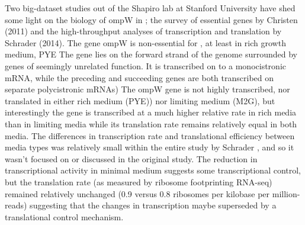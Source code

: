 Two big-dataset studies out of the Shapiro lab at Stanford University have shed some light on the biology of ompW in \caulobacter; the survey of essential genes by Christen \etal (2011) and the high-throughput analyses of transcription and translation by Schrader \etal (2014). The gene ompW is non-essential for \caulobacter, at least in rich growth medium, \ac{PYE} The gene lies on the forward strand of the genome surrounded by genes of seemingly unrelated function. It is transcribed on to a monocistronic mRNA, while the preceding and succeeding genes are both transcribed on separate polycistronic mRNAs) The ompW gene is not highly transcribed, nor translated in either rich medium (\ac{PYE})) nor limiting medium (M2G), but interestingly the gene is transcribed at a much higher relative rate in rich media than in limiting media while its translation rate remains relatively equal in both media. The differences in transcription rate and translational efficiency between media types was relatively small within the entire study by Schrader \etal, and so it wasn't focused on or discussed in the original study. The reduction in transcriptional activity in minimal medium suggests some transcriptional control, but the translation rate (as measured by ribosome footprinting RNA-seq) remained relatively unchanged (0.9 versus 0.8 ribosomes per kilobase per million-reads) suggesting that the changes in transcription maybe superseded by a translational control mechanism.

